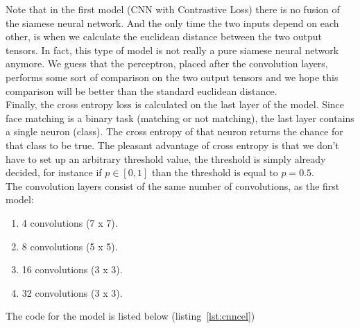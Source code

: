  Note that in the first model (CNN with Contrastive Loss) there is no fusion of the siamese neural network. And the only time the two inputs depend on each other, is when we calculate the euclidean distance between the two output tensors. In fact, this type of model is not really a pure siamese neural network anymore. We guess that the perceptron, placed after the convolution layers, performs some sort of comparison on the two output tensors and we hope this comparison will be better than the standard euclidean distance.\\

 Finally, the cross entropy loss is calculated on the last layer of the model. Since face matching is a binary task (matching or not matching), the last layer contains a single neuron (class). The cross entropy of that neuron returns the chance for that class to be true. The pleasant advantage of cross entropy is that we don't have to set up an arbitrary threshold value, the threshold is simply already decided, for instance if $p \in [0,1]$ than the threshold is equal to $p = 0.5$.\\

 The convolution layers consist of the same number of convolutions, as the first model:

 \begin{enumerate}
   \item 4 convolutions (7 x 7).
   \item 8 convolutions (5 x 5).
   \item 16 convolutions (3 x 3).
   \item 32 convolutions (3 x 3).
 \end{enumerate}

 The code for the model is listed below (listing~\ref{lst:cnncel})

